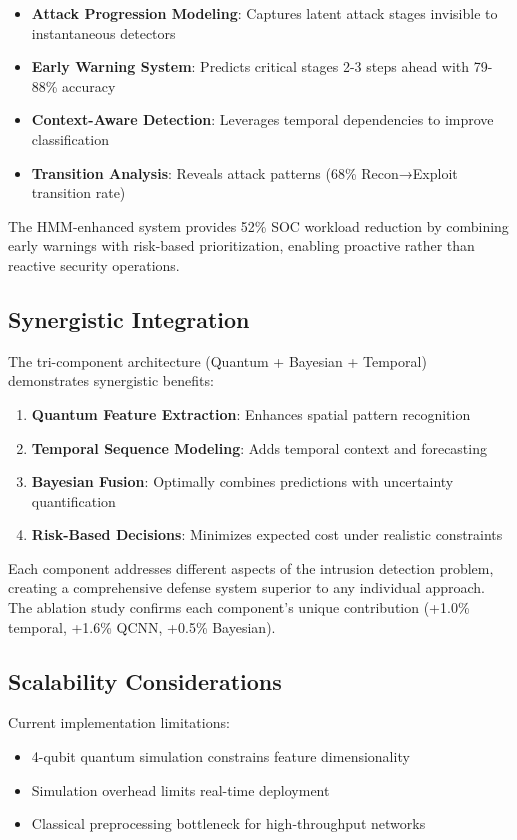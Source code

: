 \documentclass[conference]{IEEEtran}
\begin{document}
\begin{itemize}
    \item \textbf{Attack Progression Modeling}: Captures latent attack stages invisible to instantaneous detectors
    \item \textbf{Early Warning System}: Predicts critical stages 2-3 steps ahead with 79-88\% accuracy
    \item \textbf{Context-Aware Detection}: Leverages temporal dependencies to improve classification
    \item \textbf{Transition Analysis}: Reveals attack patterns (68\% Recon→Exploit transition rate)
\end{itemize}

The HMM-enhanced system provides 52\% SOC workload reduction by combining early warnings with risk-based prioritization, enabling proactive rather than reactive security operations.

\subsection{Synergistic Integration}
The tri-component architecture (Quantum + Bayesian + Temporal) demonstrates synergistic benefits:

\begin{enumerate}
    \item \textbf{Quantum Feature Extraction}: Enhances spatial pattern recognition
    \item \textbf{Temporal Sequence Modeling}: Adds temporal context and forecasting
    \item \textbf{Bayesian Fusion}: Optimally combines predictions with uncertainty quantification
    \item \textbf{Risk-Based Decisions}: Minimizes expected cost under realistic constraints
\end{enumerate}

Each component addresses different aspects of the intrusion detection problem, creating a comprehensive defense system superior to any individual approach. The ablation study confirms each component's unique contribution (+1.0\% temporal, +1.6\% QCNN, +0.5\% Bayesian).

\subsection{Scalability Considerations}
Current implementation limitations:
\begin{itemize}
    \item 4-qubit quantum simulation constrains feature dimensionality
    \item Simulation overhead limits real-time deployment
    \item Classical preprocessing bottleneck for high-throughput networks
\end{itemize}
\end{document}
